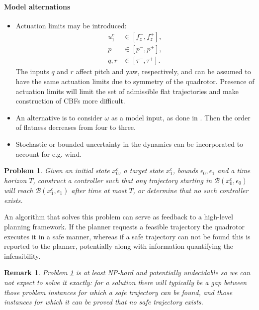 \documentclass[conference]{IEEEtran}
\newtheorem{problem}{Problem}
\newtheorem{remark}{Remark}
\begin{document}
\paragraph{Model alternations}
\begin{itemize}
  \item Actuation limits may be introduced:
  \begin{equation}
  \begin{aligned}
    u_1^c & \in [f_z^-, f_z^+], \\
    p & \in [p^-, p^+], \\
    q,r & \in [\tau^- , \tau^+].
  \end{aligned}
  \end{equation}
  The inputs $q$ and $r$ affect pitch and yaw, respectively, and can be assumed to have the same actuation limits due to symmetry of the quadrotor. Presence of actuation limits will limit the set of admissible flat trajectories and make construction of CBFs more difficult.
  \item An alternative is to consider $\omega$ as a model input, as done in \cite{Wang2017}. Then the order of flatness decreases from four to three.
  \item Stochastic or bounded uncertainty in the dynamics can be incorporated to account for e.g. wind.
\end{itemize}

\begin{problem}
  \label{prob:main}
  Given an initial state $x^c_0$, a target state $x^c_1$, bounds $\epsilon_0, \epsilon_1$ and a time horizon $T$, construct a controller such that any trajectory starting in $\mathcal B(x^c_0, \epsilon_0)$ will reach $\mathcal B(x_1^c, \epsilon_1)$ after time at most $T$, or determine that no such controller exists.
\end{problem}

An algorithm that solves this problem can serve as feedback to a high-level planning framework. If the planner requests a feasible trajectory the quadrotor executes it in a safe manner, whereas if a safe trajectory can not be found this is reported to the planner, potentially along with information quantifying the infeasibility.

\begin{remark}
  Problem \ref{prob:main} is at least NP-hard and potentially undecidable \cite{Bell2010} so we can not expect to solve it exactly: for a solution there will typically be a gap between those problem instances for which a safe trajectory can be found, and those instances for which it can be proved that no safe trajectory exists. 
\end{remark}

\printbibliography
\end{document}
